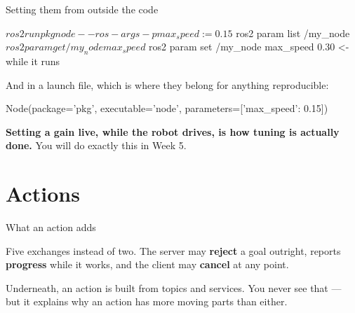 \documentclass[aspectratio=169]{beamer}
\begin{document}
\begin{frame}[fragile]{Setting them from outside the code}
  \begin{shells}
$ ros2 run pkg node --ros-args -p max_speed:=0.15

$ ros2 param list /my_node
$ ros2 param get /my_node max_speed
$ ros2 param set /my_node max_speed 0.30      <- while it runs
  \end{shells}

  \small And in a launch file, which is where they belong for anything reproducible:

  \begin{pycodes}
Node(package='pkg', executable='node',
     parameters=[{'max_speed': 0.15}])
  \end{pycodes}

  \vspace{0.3em}
  \footnotesize
  \textbf{Setting a gain live, while the robot drives, is how tuning is actually done.} You will
  do exactly this in Week 5.
\end{frame}

\section{Actions}

\begin{frame}{What an action adds}
  \begin{center}
  \end{center}

  \vspace{0.5em}
  \small
  Five exchanges instead of two. The server may \textbf{reject} a goal outright, reports
  \textbf{progress} while it works, and the client may \textbf{cancel} at any point.

  \vspace{0.4em}
  \footnotesize
  Underneath, an action is built from topics and services. You never see that --- but it
  explains why an action has more moving parts than either.
\end{frame}
\end{document}
